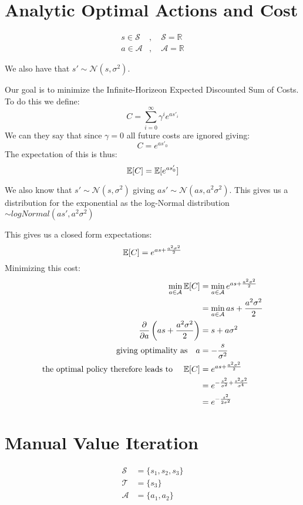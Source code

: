 \documentclass[11pt]{article}
\begin{document}
\maketitle
\thispagestyle{first}

\section{Analytic Optimal Actions and Cost}
\begin{align}
    s\in{\mathcal{S}}&,\quad \mathcal{S} = \mathbb{R}\\
    a\in{\mathcal{A}}&,\quad \mathcal{A} = \mathbb{R}
\end{align}

We also have that $s' \sim \mathcal{N}(s, \sigma^2)$. 

Our goal is to minimize the Infinite-Horizeon Expected Discounted Sum of Costs. To do this we define:
$$
C = \sum_{i=0}^\infty \gamma^ie^{as'_i}
$$
We can they say that since $\gamma = 0$ all future costs are ignored giving:
$$
C = e^{as'_0}
$$
The expectation of this is thus:
$$
\mathbb{E}[C] = \mathbb{E}[e^{as'_0}]
$$

We also know that $s'\sim\mathcal{N}(s, \sigma^2)$ giving $as'\sim\mathcal{N}(as, a^2\sigma^2)$. This gives us a distribution for the exponential as the log-Normal distribution $\sim logNormal(as', a^2\sigma^2)$

This gives us a closed form expectations:
$$
\mathbb{E}[C] = e^{as + \frac{a^2\sigma^2}{2}}
$$
Minimizing this cost:
\begin{align}
    \min_{a\in\mathcal{A}} \mathbb{E}[C] &= \min_{a\in\mathcal{A}} e^{as + \frac{a^2\sigma^2}{2}}\\
    &= \min_{a\in\mathcal{A}} as + \frac{a^2\sigma^2}{2} \\
    \frac{\partial}{\partial a}\left(as + \frac{a^2\sigma^2}{2}\right) &= s + a\sigma^2 \\
    \text{giving optimality as}\quad a &= -\frac{s}{\sigma^2}\\
    \text{the optimal policy therefore leads to }\quad \mathbb{E}[C] &= e^{as + \frac{a^2\sigma^2}{2}} \\
    &= e^{-\frac{s^2}{\sigma^2} + \frac{s^2\sigma^2}{\sigma^4}} \\
    &= e^{-\frac{s^2}{2\sigma^2}}
\end{align}

\newpage
\section{Manual Value Iteration}
\begin{align}
    \mathcal{S} &= \{s_1, s_2, s_3\} \\
    \mathcal{T} &= \{s_3\} \\
    \mathcal{A} &= \{a_1, a_2\}
\end{align}
\end{document}
